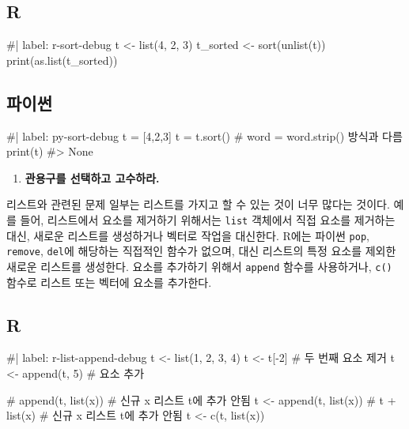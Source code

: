 \documentclass[
  letterpaper,
]{book}
\newenvironment{Shaded}{\begin{snugshade}}{\end{snugshade}}
\newcommand{\NormalTok}[1]{\textcolor[rgb]{0.00,0.23,0.31}{#1}}
\providecommand{\tightlist}{%
  \setlength{\itemsep}{0pt}\setlength{\parskip}{0pt}}\usepackage{longtable,booktabs,array}
\begin{document}
\subsection{R}

\begin{Shaded}
\begin{Highlighting}[]
\NormalTok{\#| label: r{-}sort{-}debug}
\NormalTok{t \textless{}{-} list(4, 2, 3)  }
\NormalTok{t\_sorted \textless{}{-} sort(unlist(t))}
\NormalTok{print(as.list(t\_sorted))}
\end{Highlighting}
\end{Shaded}

\subsection{파이썬}

\begin{Shaded}
\begin{Highlighting}[]
\NormalTok{\#| label: py{-}sort{-}debug}
\NormalTok{t = [4,2,3]}
\NormalTok{t = t.sort() \# word = word.strip() 방식과 다름}
\NormalTok{print(t)}
\NormalTok{\#\textgreater{} None}
\end{Highlighting}
\end{Shaded}

 

\begin{enumerate}
\def\labelenumi{\arabic{enumi}.}
\tightlist
\item
  \textbf{관용구를 선택하고 고수하라.} 
\end{enumerate}

리스트와 관련된 문제 일부는 리스트를 가지고 할 수 있는 것이 너무 많다는
것이다. 예를 들어, 리스트에서 요소를 제거하기 위해서는 \texttt{list}
객체에서 직접 요소를 제거하는 대신, 새로운 리스트를 생성하거나 벡터로
작업을 대신한다. R에는 파이썬 \texttt{pop}, \texttt{remove},
\texttt{del}에 해당하는 직접적인 함수가 없으며, 대신 리스트의 특정
요소를 제외한 새로운 리스트를 생성한다. 요소를 추가하기 위해서
\texttt{append} 함수를 사용하거나, \texttt{c()} 함수로 리스트 또는
벡터에 요소를 추가한다.

\subsection{R}

\begin{Shaded}
\begin{Highlighting}[]
\NormalTok{\#| label: r{-}list{-}append{-}debug}
\NormalTok{t \textless{}{-} list(1, 2, 3, 4)}
\NormalTok{t \textless{}{-} t[{-}2]  \# 두 번째 요소 제거}
\NormalTok{t \textless{}{-} append(t, 5) \# 요소 추가}

\NormalTok{\# append(t, list(x)) \# 신규 x 리스트 t에 추가 안됨}
\NormalTok{t \textless{}{-} append(t, list(x)) }
\NormalTok{\# t + list(x) \# 신규 x 리스트 t에 추가 안됨}
\NormalTok{t \textless{}{-} c(t, list(x))}
\end{Highlighting}
\end{Shaded}
\end{document}
